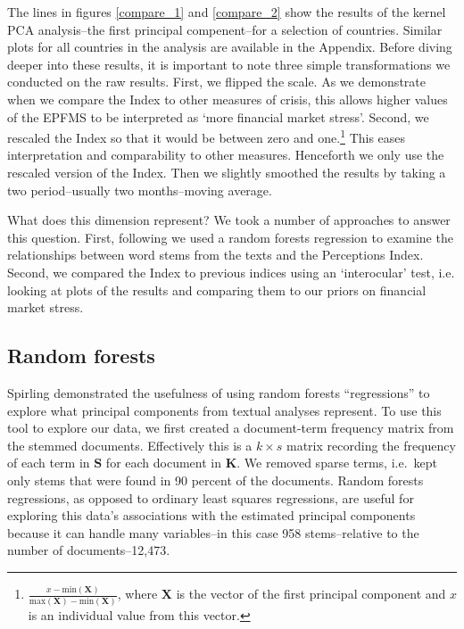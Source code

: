\documentclass[]{article}
\begin{document}
The lines in figures \ref{compare_1} and \ref{compare_2} show the
results of the kernel PCA analysis--the first principal compenent--for a selection of countries. Similar plots for all countries in the analysis are available in the Appendix. Before diving deeper into these results, it is important to note three simple transformations we conducted on the raw results. First, we flipped the
scale. As we demonstrate when we compare the Index to other measures of
crisis, this allows higher values of the EPFMS to be interpreted as
`more financial market stress'. Second, we rescaled the Index so that it
would be between zero and one.\footnote{\(\frac{x - \mathrm{min}(\bm{X})}{\mathrm{max}(\bm{X}) - \mathrm{min}(\bm{X})}\),
  where \(\bm{X}\) is the vector of the first principal component and
  \(x\) is an individual value from this vector.} This eases
interpretation and comparability to other measures. Henceforth we only
use the rescaled version of the Index. Then we slightly smoothed the
results by taking a two period--usually two months--moving average.

What does this dimension represent? We took a number of approaches to
answer this question. First, following \cite{Spirling2012} we used a random
forests regression \citep{Breiman2001,jones2015} to examine the
relationships between word stems from the texts and the Perceptions
Index. Second, we compared the Index to previous indices using an
`interocular' test, i.e. looking at plots of the results and comparing
them to our priors on financial market stress.

\subsection{Random forests}\label{random-forests}

Spirling \citeyearpar[6--8]{Spirling2012} demonstrated the usefulness of using random forests
``regressions'' to explore what principal components from textual
analyses represent. To use this tool to explore our data, we first created a document-term
frequency matrix from the stemmed documents. Effectively this is a
\(k \times s\) matrix recording the frequency of each term in \(\bm{S}\)
for each document in \(\bm{K}\). We removed sparse terms, i.e.~kept only
stems that were found in 90 percent of the documents. Random forests
regressions, as opposed to ordinary least squares regressions, are useful
for exploring this data's associations with the estimated principal components because it can handle many variables--in this case 958 stems--relative to the number of documents--12,473.
\end{document}
